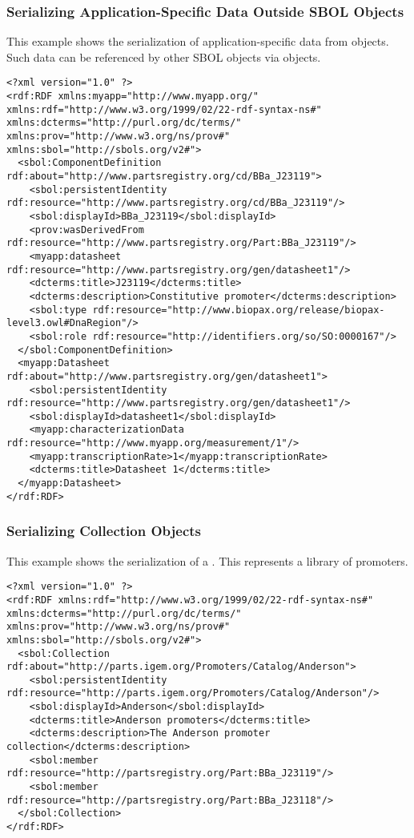 \subsubsection{Serializing Application-Specific Data Outside SBOL Objects}
This example shows the serialization of application-specific data from  objects. Such data can be referenced by other SBOL objects via  objects.
\begin{lstlisting}
<?xml version="1.0" ?>
<rdf:RDF xmlns:myapp="http://www.myapp.org/" xmlns:rdf="http://www.w3.org/1999/02/22-rdf-syntax-ns#" xmlns:dcterms="http://purl.org/dc/terms/" xmlns:prov="http://www.w3.org/ns/prov#" xmlns:sbol="http://sbols.org/v2#">
  <sbol:ComponentDefinition rdf:about="http://www.partsregistry.org/cd/BBa_J23119">
    <sbol:persistentIdentity rdf:resource="http://www.partsregistry.org/cd/BBa_J23119"/>
    <sbol:displayId>BBa_J23119</sbol:displayId>
    <prov:wasDerivedFrom rdf:resource="http://www.partsregistry.org/Part:BBa_J23119"/>
    <myapp:datasheet rdf:resource="http://www.partsregistry.org/gen/datasheet1"/>
    <dcterms:title>J23119</dcterms:title>
    <dcterms:description>Constitutive promoter</dcterms:description>
    <sbol:type rdf:resource="http://www.biopax.org/release/biopax-level3.owl#DnaRegion"/>
    <sbol:role rdf:resource="http://identifiers.org/so/SO:0000167"/>
  </sbol:ComponentDefinition>
  <myapp:Datasheet rdf:about="http://www.partsregistry.org/gen/datasheet1">
    <sbol:persistentIdentity rdf:resource="http://www.partsregistry.org/gen/datasheet1"/>
    <sbol:displayId>datasheet1</sbol:displayId>
    <myapp:characterizationData rdf:resource="http://www.myapp.org/measurement/1"/>
    <myapp:transcriptionRate>1</myapp:transcriptionRate>
    <dcterms:title>Datasheet 1</dcterms:title>
  </myapp:Datasheet>
</rdf:RDF>
\end{lstlisting}


\subsubsection{Serializing Collection Objects}
This example shows the serialization of a . This  represents a library of promoters.
\begin{lstlisting}
<?xml version="1.0" ?>
<rdf:RDF xmlns:rdf="http://www.w3.org/1999/02/22-rdf-syntax-ns#" xmlns:dcterms="http://purl.org/dc/terms/" xmlns:prov="http://www.w3.org/ns/prov#" xmlns:sbol="http://sbols.org/v2#">
  <sbol:Collection rdf:about="http://parts.igem.org/Promoters/Catalog/Anderson">
    <sbol:persistentIdentity rdf:resource="http://parts.igem.org/Promoters/Catalog/Anderson"/>
    <sbol:displayId>Anderson</sbol:displayId>
    <dcterms:title>Anderson promoters</dcterms:title>
    <dcterms:description>The Anderson promoter collection</dcterms:description>
    <sbol:member rdf:resource="http://partsregistry.org/Part:BBa_J23119"/>
    <sbol:member rdf:resource="http://partsregistry.org/Part:BBa_J23118"/>
  </sbol:Collection>
</rdf:RDF>
\end{lstlisting}

